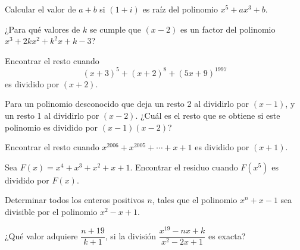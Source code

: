 \begin{multicols}{2}
    \begin{exercise}
        Calcular el valor de $a + b$ si $(1 + i)$ es raíz del polinomio $x^5 + ax^3 + b$.
    \end{exercise}

    \begin{exercise}
        ¿Para qué valores de $k$ se cumple que $(x - 2)$ es un factor del polinomio $x^3 + 2kx^2 + k^2 x + k - 3$?
    \end{exercise}

    \begin{exercise}
        Encontrar el resto cuando
        \[
            (x + 3)^5 + (x + 2)^8 + (5x + 9)^{1997}
        \]
        es dividido por $(x + 2)$.
    \end{exercise}

    \begin{exercise}
        Para un polinomio desconocido que deja un resto 2 al dividirlo por $(x - 1)$, y un resto 1 al dividirlo por $(x - 2)$.
        ¿Cuál es el resto que se obtiene si este polinomio es dividido por $(x - 1)(x - 2)$?
    \end{exercise}

    \begin{exercise}
        Encontrar el resto cuando $x^{2006} + x^{2005} + \cdots + x + 1$ es dividido por $(x + 1)$.
    \end{exercise}

    \begin{exercise}
        Sea $F(x) = x^4 + x^3 + x^2 + x + 1$.
        Encontrar el residuo cuando $F(x^5)$ es dividido por $F(x)$.
    \end{exercise}

    \begin{problem}
        Determinar todos los enteros positivos $n$, tales que el polinomio $x^n + x - 1$ sea divisible por el polinomio $x^2 - x + 1$.
    \end{problem}

    \begin{problem}
        ¿Qué valor adquiere $\dfrac{n + 19}{k + 1}$, si la división $\dfrac{x^{19} - nx + k}{x^2 - 2x + 1}$ es exacta?
    \end{problem}
\end{multicols}